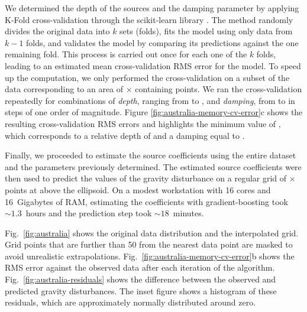 We determined the depth of the sources and the damping parameter by applying
K-Fold cross-validation through the scikit-learn library \citep{sklearn2011}.
The method randomly divides the original data into $k$ sets (folds), fits the
model using only data from $k - 1$ folds, and validates the model by comparing
its predictions against the one remaining fold.
This process is carried out once for each one of the $k$ folds, leading to
an estimated mean cross-validation RMS error for the model.
To speed up the computation, we only performed the cross-validation on a subset
of the data corresponding to an area of
\AustraliaSmallAreaEastingSize{}$\times$\AustraliaSmallAreaNorthingSize{}
containing \AustraliaSmallAreaNPoints{} points.
We ran the cross-validation repeatedly for combinations of \emph{depth},
ranging from \AustraliaDepthMin{} to \AustraliaDepthMax{},
and \emph{damping}, from \AustraliaDampingMin{} to \AustraliaDampingMax{} in
steps of one order of magnitude.
Figure \ref{fig:australia-memory-cv-error}c shows the resulting
cross-validation RMS errors and highlights the minimum value of
\AustraliaEqlRmsScore{}, which corresponds to a relative depth of
\AustraliaEqlDepth{} and a damping equal to \AustraliaEqlDamping{}.

Finally, we proceeded to estimate the source coefficients using the entire
dataset and the parameters previously determined.
The estimated source coefficients were then used to predict the values of the
gravity disturbance on a regular grid of
\AustraliaEqlGridNLongitude{}$\times$\AustraliaEqlGridNLatitude{} points at
\AustraliaEqlGridHeight{} above the ellipsoid.
On a modest workstation with 16 cores and 16~Gigabytes of RAM,
estimating the \AustraliaEqlNSources{} coefficients with gradient-boosting took
$\sim 1.3$~hours and the prediction step took $\sim 18$~minutes.

Fig.~\ref{fig:australia} shows the original data distribution and the
interpolated grid.
Grid points that are further than 50\km{} from the nearest data point are
masked to avoid unrealistic extrapolations.
Fig.~\ref{fig:australia-memory-cv-error}b shows the RMS error against the
observed data after each iteration of the algorithm.
Fig.~\ref{fig:australia-residuals} shows the difference between the observed
and predicted gravity disturbances.
The inset figure shows a histogram of these residuals, which are approximately
normally distributed around zero.

